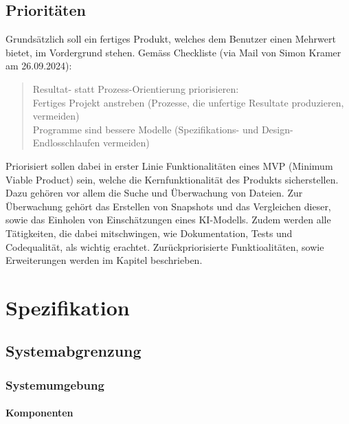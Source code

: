 \documentclass[a4paper,12pt]{report}
\begin{document}
    \section{Prioritäten}
    Grundsätzlich soll ein fertiges Produkt, welches dem Benutzer einen Mehrwert bietet, im Vordergrund stehen.
    Gemäss Checkliste (via Mail von Simon Kramer am 26.09.2024):
    \begin{quote}
        Resultat- statt Prozess-Orientierung priorisieren:
        \\Fertiges Projekt anstreben (Prozesse, die unfertige Resultate produzieren, vermeiden)
        \\Programme sind bessere Modelle (Spezifikations- und Design-Endlosschlaufen vermeiden)
    \end{quote}

    Priorisiert sollen dabei in erster Linie Funktionalitäten eines MVP (Minimum Viable Product) sein, welche die Kernfunktionalität des Produkts sicherstellen.
    Dazu gehören vor allem die Suche und Überwachung von Dateien.
    Zur Überwachung gehört das Erstellen von Snapshots und das Vergleichen dieser, sowie das Einholen von Einschätzungen eines KI-Modells.
    Zudem werden alle Tätigkeiten, die dabei mitschwingen, wie Dokumentation, Tests und Codequalität, als wichtig erachtet.
    Zurückpriorisierte Funktioalitäten, sowie Erweiterungen werden im Kapitel  beschrieben.


    \chapter{Spezifikation}

    \newpage


    \section{Systemabgrenzung}

    \subsection{Systemumgebung}

    \subsubsection{Komponenten}
\end{document}
